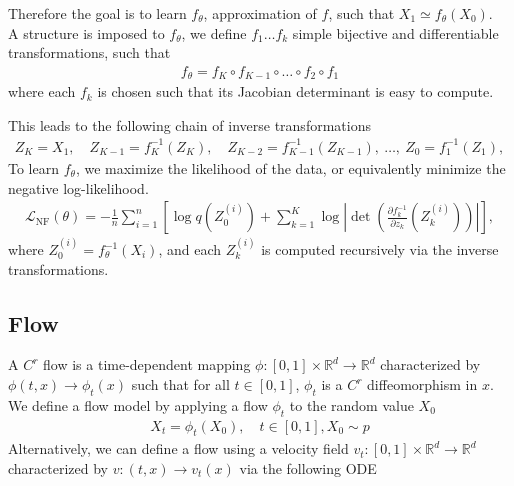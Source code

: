 \documentclass{article}
\begin{document}
Therefore the goal is to learn \(f_\theta\), approximation of \(f\), such that \(X_1 \simeq f_\theta(X_0)\). \\
A structure is imposed to $f_\theta$, we define $f_1\ldots f_k$ simple bijective and differentiable transformations,  such that
\begin{align}
    f_\theta = f_K\circ f_{K-1}\circ\ldots\circ f_2\circ f_1
\end{align}
where each \( f_k \) is chosen such that its Jacobian determinant is easy to compute.

\begin{comment}
There is then, 
\begin{align}
    X_0\sim p_0=q, \quad f_1(X_0) = X_1 \implies X_1\sim p_1,\quad f(X_1)=X_2 \ldots f(X_{k-1})=X_k \sim p_k = \hat{p} \simeq p
\end{align}
\end{comment}
This leads to the following chain of inverse transformations
\begin{align}
    Z_K = X_1,\quad Z_{K-1} = f_K^{-1}(Z_K),\quad Z_{K-2} = f_{K-1}^{-1}(Z_{K-1}),\ \dots,\ Z_0 = f_1^{-1}(Z_1),
\end{align}
To learn \(f_\theta\), we maximize the likelihood of the data, or equivalently minimize the negative log-likelihood.
\begin{align}
    \mathcal{L}_\text{NF}(\theta) 
    = -\frac{1}{n} \sum_{i=1}^n \left[ \log q(Z_0^{(i)}) + \sum_{k=1}^K \log \left| \det \left( \frac{\partial f_k^{-1}}{\partial z_{k}}(Z_k^{(i)}) \right) \right| \right],
\end{align}
where \( Z_0^{(i)} = f_\theta^{-1}(X_i) \), and each \( Z_k^{(i)} \) is computed recursively via the inverse transformations.


\subsection{Flow}
A $C^r$ flow is a time-dependent mapping $\phi : [0,1]\times \mathbb{R}^d\rightarrow\mathbb{R}^d$ characterized by $\phi(t,x) \rightarrow \phi_t(x)$ such that for all $t\in[0,1]$, $\phi_t$ is a $C^r$ diffeomorphism in $x$.
We define a flow model by applying a flow $\phi_t$ to the random value $X_0$
\begin{align}\label{flow-model}
    X_t=\phi_t(X_0), \quad t \in[0,1], X_0\sim p 
\end{align}
Alternatively, we can define a flow using a velocity field \(v_t:[0,1]\times\mathbb{R}^d\rightarrow \mathbb{R}^d\) characterized by \(v:(t,x)\rightarrow v_t(x)\) via the following ODE 
\end{document}

